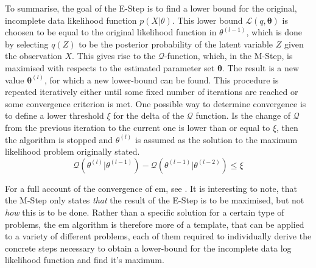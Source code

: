 To summarise, the goal of the E-Step is to find a lower bound for the original, incomplete data likelihood function $p(X\vert\theta)$. This lower bound $\mathcal{L}(q,\bm\theta)$ is choosen to be equal to the original likelihood function in $\theta^{(l-1)}$, which is done by selecting $q(Z)$ to be the posterior probability of the latent variable $Z$ given the observation $X$. This gives rise to the $\mathcal{Q}$-function, which, in the M-Step, is maximised with respects to the estimated parameter set $\bm\theta$. The result is a new value $\bm\theta^{(l)}$, for which a new lower-bound can be found. This procedure is repeated iteratively either until some fixed number of iterations are reached or some convergence criterion is met. One possible way to determine convergence is to define a lower threshold $\xi$ for the delta of the $\mathcal{Q}$ function. Is the change of $\mathcal{Q}$ from the previous iteration to the current one is lower than or equal to $\xi$, then the algorithm is stopped and $\theta^{(l)}$ is assumed as the solution to the maximum likelihood problem originally stated.
\begin{equation}
    \mathcal{Q}(\theta^{(l)}\vert\theta^{(l-1)})-\mathcal{Q}(\theta^{(l-1)}\vert\theta^{(l-2)})\leq\xi
    \label{eq:convergence-check}
\end{equation}

For a full account of the convergence of \gls{em}, see \cite{Wu1983}. It is interesting to note, that the M-Step only states \textit{that} the result of the E-Step is to be maximised, but not \textit{how} this is to be done. Rather than a specific solution for a certain type of problems, the \gls{em} algorithm is therefore more of a template, that can be applied to a variety of different problems, each of them required to individually derive the concrete steps necessary to obtain a lower-bound for the incomplete data log likelihood function and find it's maximum.

